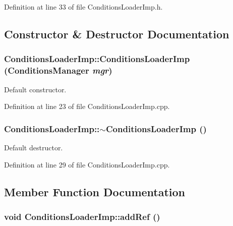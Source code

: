 Definition at line 33 of file ConditionsLoaderImp.h.

\subsection{Constructor \& Destructor Documentation}
\hypertarget{class_d_d4hep_1_1_conditions_1_1_conditions_loader_imp_a15a84941b8bf86ada6c80f0a0aaea082}{
\subsubsection[{ConditionsLoaderImp}]{\setlength{\rightskip}{0pt plus 5cm}ConditionsLoaderImp::ConditionsLoaderImp ({\bf ConditionsManager} {\em mgr})}}
\label{class_d_d4hep_1_1_conditions_1_1_conditions_loader_imp_a15a84941b8bf86ada6c80f0a0aaea082}


Default constructor. 

Definition at line 23 of file ConditionsLoaderImp.cpp.\hypertarget{class_d_d4hep_1_1_conditions_1_1_conditions_loader_imp_aff5e22b90011ae57c1ea4a5685ada304}{
\subsubsection[{$\sim$ConditionsLoaderImp}]{\setlength{\rightskip}{0pt plus 5cm}ConditionsLoaderImp::$\sim$ConditionsLoaderImp ()}}
\label{class_d_d4hep_1_1_conditions_1_1_conditions_loader_imp_aff5e22b90011ae57c1ea4a5685ada304}


Default destructor. 

Definition at line 29 of file ConditionsLoaderImp.cpp.

\subsection{Member Function Documentation}
\hypertarget{class_d_d4hep_1_1_conditions_1_1_conditions_loader_imp_a6302206e3ebcdf712425df5468598e2c}{
\subsubsection[{addRef}]{\setlength{\rightskip}{0pt plus 5cm}void ConditionsLoaderImp::addRef ()}}
\label{class_d_d4hep_1_1_conditions_1_1_conditions_loader_imp_a6302206e3ebcdf712425df5468598e2c}


